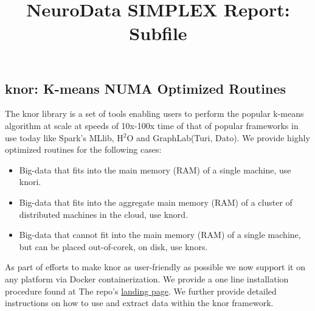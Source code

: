 \documentclass[simplex.tex]{subfiles}
\title{NeuroData SIMPLEX Report: Subfile}
\begin{document}

\subsection{knor: K-means NUMA Optimized Routines}

The \textsf{knor} library is a set of tools enabling users to perform the
popular k-means algorithm at scale at speeds of 10x-100x time of that of popular
frameworks in use today like Spark's MLlib, H$^2$O and GraphLab(Turi, Dato).
We provide highly optimized routines for the
following cases:

\begin{itemize}
\item Big-data that fits into the main memory (RAM) of a single machine, use
        \textsf{knori}. 
\item Big-data that fits into the aggregate main memory (RAM) of a cluster
        of distributed machines in the cloud, use \textsf{knord}. 
\item Big-data that cannot fit into the main memory (RAM) of a single machine,
        but can be placed out-of-corek, on disk, use \textsf{knors}.
\end{itemize}

As part of efforts to make \textsf{knor} as user-friendly as possible we now
support it on any platform via Docker containerization. We provide a one line
installation procedure found at The repo's
\href{https://github.com/disa-mhembere/knor/}{landing page}.
We further provide detailed instructions on how to use and extract data within
the \textsf{knor} framework.
\end{document}
